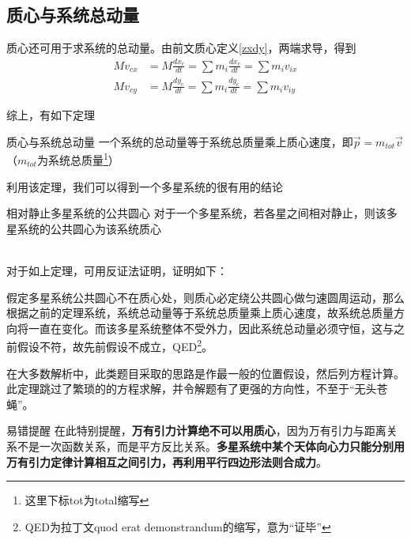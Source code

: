 \subsection{质心与系统总动量}
质心还可用于求系统的总动量。由前文质心定义\eqref{zxdy}，两端求导，得到
\begin{subequations}
\begin{align*}
M v_{cx} &= M \frac{d x_c}{dt} = \sum m_i \frac{d x_c}{dt} = \sum m_i v_{ix} \\
M v_{cy} &= M \frac{d y_c}{dt} = \sum m_i \frac{d y_c}{dt} = \sum m_i v_{iy}
\end{align*}
\end{subequations}

综上，有如下定理

\label{zxyxtzdl}
\begin{theo}{质心与系统总动量}{}
一个系统的总动量等于系统总质量乘上质心速度，即$\vec{p} = m_{tot} \vec{v}$（$m_{tot}$为系统总质量\footnote{这里下标tot为total缩写}）
\end{theo}

利用该定理，我们可以得到一个多星系统的很有用的结论
~\\

\begin{minipage}[b]{0.35\linewidth}

\end{minipage}
\hfill
\begin{minipage}[b]{0.55\linewidth}
\begin{theo}{相对静止多星系统的公共圆心}{}
对于一个多星系统，若各星之间相对静止，则该多星系统的公共圆心为该系统质心
\end{theo}
\end{minipage}
~\\

对于如上定理，可用反证法证明，证明如下：

假定多星系统公共圆心不在质心处，则质心必定绕公共圆心做匀速圆周运动，那么根据之前的定理系统，系统总动量等于系统总质量乘上质心速度，故系统总质量方向将一直在变化。而该多星系统整体不受外力，因此系统总动量必须守恒，这与之前假设不符，故先前假设不成立，QED\footnote{QED为拉丁文quod erat demonstrandum的缩写，意为“证毕”}。

在大多数解析中，此类题目采取的思路是作最一般的位置假设，然后列方程计算。此定理跳过了繁琐的的方程求解，并令解题有了更强的方向性，不至于“无头苍蝇”。

\begin{mk}{易错提醒}{}
在此特别提醒，\textbf{万有引力计算绝不可以用质心}，因为万有引力与距离关系不是一次函数关系，而是平方反比关系。\textbf{多星系统中某个天体向心力只能分别用万有引力定律计算相互之间引力，再利用平行四边形法则合成力}。
\end{mk}

